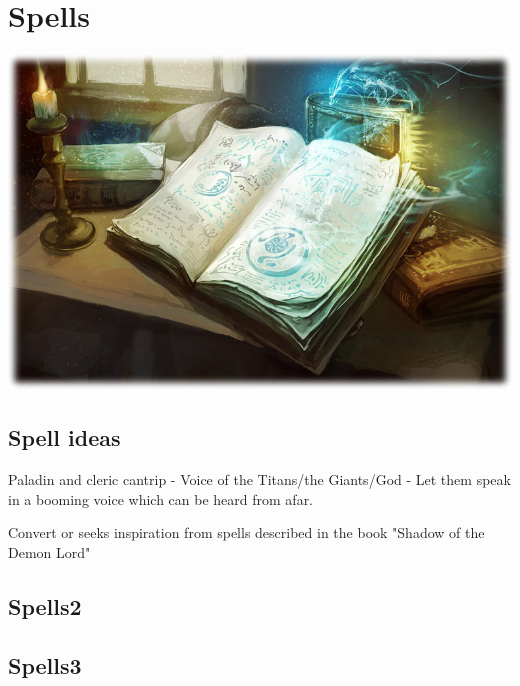 \clearpage
\section{Spells}
\includegraphics[width=\linewidth]{figures/spells/spellbookTransEdge.jpg}
\lipsum[1]
\subsection{Spell ideas}
Paladin and cleric cantrip - Voice of the Titans/the Giants/God - Let them speak in a booming voice which can be heard from afar.

Convert or seeks inspiration from spells described in the book "Shadow of the Demon Lord"

\subsection{Spells2}
\lipsum[2]
\subsection{Spells3}
\lipsum[2]